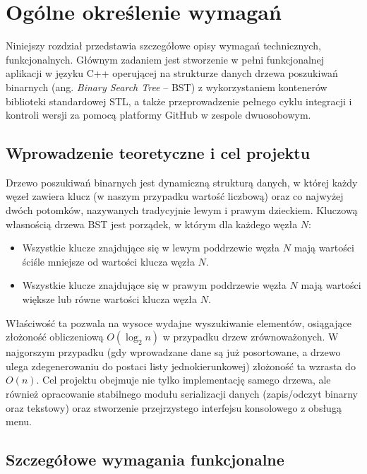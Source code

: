 \newpage
\section{Ogólne określenie wymagań}		%

\hspace{0.60cm}
Niniejszy rozdział przedstawia szczegółowe opisy wymagań technicznych, funkcjonalnych. Głównym zadaniem jest stworzenie w pełni funkcjonalnej aplikacji w języku C++ operującej na strukturze danych drzewa poszukiwań binarnych (ang. \textit{Binary Search Tree} -- BST) z wykorzystaniem kontenerów biblioteki standardowej STL, a także przeprowadzenie pełnego cyklu integracji i kontroli wersji za pomocą platformy GitHub w zespole dwuosobowym.

\subsection{Wprowadzenie teoretyczne i cel projektu}

\hspace{0.60cm}
Drzewo poszukiwań binarnych jest dynamiczną strukturą danych, w której każdy węzeł zawiera klucz (w naszym przypadku wartość liczbową) oraz co najwyżej dwóch potomków, nazywanych tradycyjnie lewym i prawym dzieckiem. Kluczową własnością drzewa BST jest porządek, w którym dla każdego węzła $N$:
\begin{itemize}
    \item Wszystkie klucze znajdujące się w lewym poddrzewie węzła $N$ mają wartości ściśle mniejsze od wartości klucza węzła $N$.
    \item Wszystkie klucze znajdujące się w prawym poddrzewie węzła $N$ mają wartości większe lub równe wartości klucza węzła $N$.
\end{itemize}

\hspace{0.60cm}
Właściwość ta pozwala na wysoce wydajne wyszukiwanie elementów, osiągające złożoność obliczeniową $O(\log_2 n)$ w przypadku drzew zrównoważonych. W najgorszym przypadku (gdy wprowadzane dane są już posortowane, a drzewo ulega zdegenerowaniu do postaci listy jednokierunkowej) złożoność ta wzrasta do $O(n)$. Cel projektu obejmuje nie tylko implementację samego drzewa, ale również opracowanie stabilnego modułu serializacji danych (zapis/odczyt binarny oraz tekstowy) oraz stworzenie przejrzystego interfejsu konsolowego z obsługą menu.

\subsection{Szczegółowe wymagania funkcjonalne}

